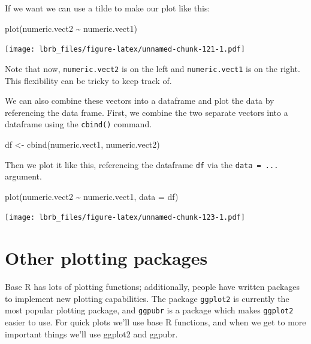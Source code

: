 \documentclass[
]{book}
\newenvironment{Shaded}{\begin{snugshade}}{\end{snugshade}}
\newcommand{\AttributeTok}[1]{\textcolor[rgb]{0.77,0.63,0.00}{#1}}
\newcommand{\FunctionTok}[1]{\textcolor[rgb]{0.00,0.00,0.00}{#1}}
\newcommand{\NormalTok}[1]{#1}
\newcommand{\OtherTok}[1]{\textcolor[rgb]{0.56,0.35,0.01}{#1}}
\newcommand{\SpecialCharTok}[1]{\textcolor[rgb]{0.00,0.00,0.00}{#1}}
\begin{document}
If we want we can use a tilde to make our plot like this:

\begin{Shaded}
\begin{Highlighting}[]
\FunctionTok{plot}\NormalTok{(numeric.vect2 }\SpecialCharTok{\textasciitilde{}}\NormalTok{ numeric.vect1)}
\end{Highlighting}
\end{Shaded}

\texttt{[image: lbrb\_files/figure-latex/unnamed-chunk-121-1.pdf]}

Note that now, \texttt{numeric.vect2} is on the left and \texttt{numeric.vect1} is on the right. This flexibility can be tricky to keep track of.

We can also combine these vectors into a dataframe and plot the data by referencing the data frame. First, we combine the two separate vectors into a dataframe using the \texttt{cbind()} command.

\begin{Shaded}
\begin{Highlighting}[]
\NormalTok{df }\OtherTok{\textless{}{-}} \FunctionTok{cbind}\NormalTok{(numeric.vect1, numeric.vect2)}
\end{Highlighting}
\end{Shaded}

Then we plot it like this, referencing the dataframe \texttt{df} via the \texttt{data\ =\ ...} argument.

\begin{Shaded}
\begin{Highlighting}[]
\FunctionTok{plot}\NormalTok{(numeric.vect2 }\SpecialCharTok{\textasciitilde{}}\NormalTok{ numeric.vect1, }\AttributeTok{data =}\NormalTok{ df)}
\end{Highlighting}
\end{Shaded}

\texttt{[image: lbrb\_files/figure-latex/unnamed-chunk-123-1.pdf]}

\hypertarget{other-plotting-packages}{%
\section{Other plotting packages}\label{other-plotting-packages}}

Base R has lots of plotting functions; additionally, people have written packages to implement new plotting capabilities. The package \texttt{ggplot2} is currently the most popular plotting package, and \texttt{ggpubr} is a package which makes \texttt{ggplot2} easier to use. For quick plots we'll use base R functions, and when we get to more important things we'll use ggplot2 and ggpubr.
\end{document}
